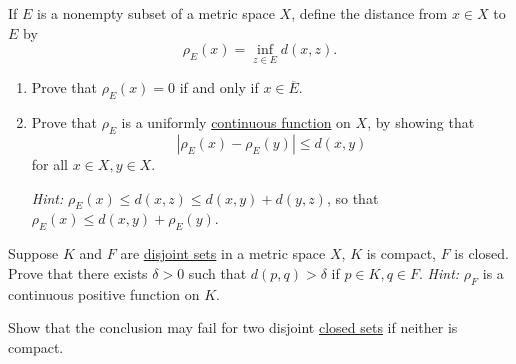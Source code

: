   \begin{exercise}[Rudin 4.20]
    If $E$ is a nonempty subset of a metric space $X$, define the distance from $x \in X$ to $E$ by
    \begin{equation}
      \rho_E(x) = \inf_{z \in E} d(x, z).
    \end{equation}
    \begin{enumerate}
      \item[(a)] Prove that $\rho_E(x) = 0$ if and only if $x \in \overline{E}$.
      \item[(b)] Prove that $\rho_E$ is a uniformly \hyperref[pst-def:continuous_func]{continuous function} on $X$, by showing that
        \begin{equation}
          |\rho_E(x) - \rho_E(y)| \le d(x, y)
        \end{equation}
        for all $x \in X, y \in X$.
        \par \textit{Hint:} $\rho_E(x) \le d(x, z) \le d(x, y) + d(y, z)$, so that $\rho_E(x) \le d(x, y) + \rho_E(y)$.
    \end{enumerate}
  \end{exercise}
  \begin{solution}

  \end{solution}

  \begin{exercise}[Rudin 4.21]
    Suppose $K$ and $F$ are \hyperref[st-def:disjoint-sets]{disjoint sets} in a metric space $X$, $K$ is compact, $F$ is closed. Prove that there exists $\delta > 0$ such that $d(p, q) > \delta$ if $p \in K, q \in F$. \textit{Hint:} $\rho_F$ is a continuous positive function on $K$.
    \par Show that the conclusion may fail for two disjoint \hyperref[pst-def:closed]{closed sets} if neither is compact.
  \end{exercise}
  \begin{solution}

  \end{solution}

